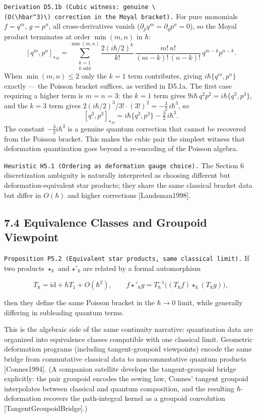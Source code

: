 \documentclass[
]{article}
\begin{document}
\texttt{Derivation\ D5.1b\ (Cubic\ witness:\ genuine\ \textbackslash{}(O(\textbackslash{}hbar\^{}3)\textbackslash{})\ correction\ in\ the\ Moyal\ bracket).}
For pure monomials \(f=q^m\), \(g=p^n\), all cross-derivatives vanish
(\(\partial_p q^m=\partial_q p^n=0\)), so the Moyal product terminates
at order \(\min(m,n)\) in \(\hbar\):
\[[q^m,p^n]_{\star_M}=\sum_{\substack{k=1\\k\;\mathrm{odd}}}^{\min(m,n)}\frac{2(i\hbar/2)^k}{k!}\,\frac{m!\,n!}{(m\!-\!k)!\,(n\!-\!k)!}\,q^{m-k}p^{n-k}.\]
When \(\min(m,n)\le 2\) only the \(k=1\) term contributes, giving
\(i\hbar\{q^m,p^n\}\) exactly --- the Poisson bracket suffices, as
verified in D5.1a. The first case requiring a higher term is \(m=n=3\):
the \(k=1\) term gives \(9i\hbar\,q^2p^2=i\hbar\{q^3,p^3\}\), and the
\(k=3\) term gives \(2(i\hbar/2)^3/3!\cdot(3!)^2=-\tfrac32\,i\hbar^3\),
so \[[q^3,p^3]_{\star_M}=i\hbar\{q^3,p^3\}-\tfrac32\,i\hbar^3.\] The
constant \(-\tfrac32 i\hbar^3\) is a genuine quantum correction that
cannot be recovered from the Poisson bracket. This makes the cubic pair
the simplest witness that deformation quantization goes beyond a
re-encoding of the Poisson algebra.

\texttt{Heuristic\ H5.1\ (Ordering\ as\ deformation\ gauge\ choice).}
The Section 6 discretization ambiguity is naturally interpreted as
choosing different but deformation-equivalent star products; they share
the same classical bracket data but differ in \(O(\hbar)\) and higher
corrections {[}Landsman1998{]}.

\subsection{7.4 Equivalence Classes and Groupoid
Viewpoint}\label{equivalence-classes-and-groupoid-viewpoint}

\texttt{Proposition\ P5.2\ (Equivalent\ star\ products,\ same\ classical\ limit).}
If two products \(\star_\hbar\) and \(\star'_\hbar\) are related by a
formal automorphism

\[
T_\hbar=\mathrm{id}+\hbar T_1+O(\hbar^2),
\qquad
f\star'_\hbar g
=
T_\hbar^{-1}\!\big((T_\hbar f)\star_\hbar(T_\hbar g)\big),
\]

then they define the same Poisson bracket in the \(\hbar\to0\) limit,
while generally differing in subleading quantum terms.

This is the algebraic side of the same continuity narrative:
quantization data are organized into equivalence classes compatible with
one classical limit. Geometric deformation programs (including
tangent-groupoid viewpoints) encode the same bridge from commutative
classical data to noncommutative quantum products {[}Connes1994{]}. (A
companion satellite develops the tangent-groupoid bridge explicitly: the
pair groupoid encodes the sewing law, Connes' tangent groupoid
interpolates between classical and quantum composition, and the
resulting \(\hbar\)-deformation recovers the path-integral kernel as a
groupoid convolution {[}TangentGroupoidBridge{]}.)
\end{document}
